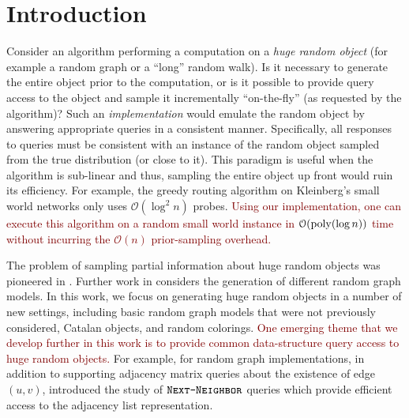 \section{Introduction}
Consider an algorithm performing a computation on a \emph{huge random object} (for example a random graph or a ``long'' random walk).
Is it necessary to generate the entire object prior to the computation,
or is it possible to provide query access to the object and sample it incrementally ``on-the-fly'' (as requested by the algorithm)?
Such an \emph{implementation} would emulate the random object by answering appropriate queries in a consistent manner.
Specifically, all responses to queries must be consistent with an instance of the random object sampled from the true distribution (or close to it).
This paradigm is useful when the algorithm is sub-linear and thus, sampling the entire object up front would ruin its efficiency.
For example, the greedy routing algorithm on Kleinberg's small world networks \cite{kleinberg} only uses $\mathcal O(\log^2 n)$ probes.
\textcolor{Maroon}{Using our implementation, one can execute this algorithm on a random small world instance
in $\mathcal O(\mathrm{poly}(\log n))$ time without incurring the $\mathcal O(n)$ prior-sampling overhead.}

The problem of sampling partial information about huge random objects was pioneered in \cite{huge,huge_old,huge_journal}.
Further work in \cite{sparse,reut} considers the generation of different random graph models.
In this work, we focus on generating huge random objects in a number of new settings,
including basic random graph models that were not previously considered, Catalan objects, and random colorings.
\textcolor{Maroon}{One emerging theme that we develop further in this work is to provide common data-structure query access to huge random objects.}
For example, for random graph implementations, in addition to supporting adjacency matrix queries about the existence of edge $(u,v)$,
\cite{reut} introduced the study of $\texttt{\textsc{Next-Neighbor}}$ queries which provide efficient access to the adjacency list representation.





